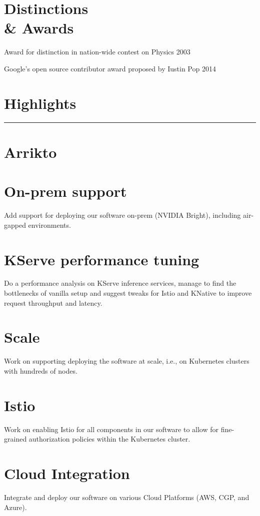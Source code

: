 \documentclass[margin,centered]{res}
\newenvironment{list1}{
  \begin{list}{\ding{71}}{%
      \setlength{\itemsep}{0in}
      \setlength{\parsep}{0in} \setlength{\parskip}{0in}
      \setlength{\topsep}{0in} \setlength{\partopsep}{0in}
      \setlength{\leftmargin}{0.17in}}}{\end{list}}
\begin{document}
\begin{resume}
\section{\sc Distinctions\\\& Awards}
\begin{list1}
\item
  Award for distinction in nation-wide contest on Physics 2003
\item
  Google's open source contributor award proposed by Iustin Pop 2014
\end{list1}

\section{Highlights}
\rule[3pt]{\textwidth}{0.4pt}

\section{Arrikto}

\section{\sc On-prem support}
Add support for deploying our software on-prem (NVIDIA Bright), including
air-gapped environments.

\section{\sc KServe performance tuning}
Do a performance analysis on KServe inference services, manage to find the
bottlenecks of vanilla setup and suggest tweaks for Istio and KNative to
improve request throughput and latency.

\section{\sc Scale}
Work on supporting deploying the software at scale, i.e., on Kubernetes
clusters with hundreds of nodes.

\section{\sc Istio}
Work on enabling Istio for all components in our software to allow for
fine-grained authorization policies within the Kubernetes cluster.

\section{\sc Cloud Integration}
Integrate and deploy our software on various Cloud Platforms (AWS, CGP, and
Azure).


\end{resume}
\end{document}
